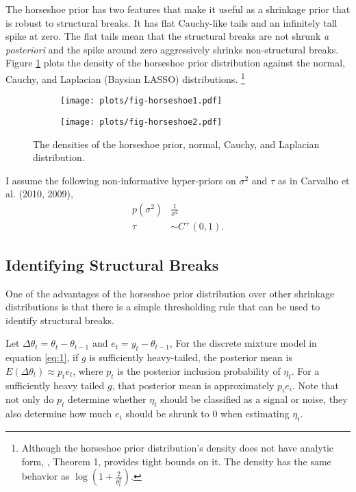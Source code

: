 \documentclass{article}
\begin{document}
The horseshoe prior has two features that make it useful as a shrinkage prior that is robust to structural breaks.
It has flat Cauchy-like tails and an infinitely tall spike at zero.
The flat tails mean that the structural breaks are not shrunk \textit{a posteriori} and the spike around zero aggressively shrinks non-structural breaks.
Figure \ref{fig:horseshoe} plots the density of the horseshoe prior distribution against the normal, Cauchy, and Laplacian (Baysian LASSO) distributions.%
\footnote{
  Although the horseshoe prior distribution's density does not have analytic form, \textcite{CarvalhoPolsonScott2010}, Theorem 1, provides tight bounds on it.
  The density has the same behavior as $\log (1 + \frac{2}{\theta_{t}^{2}})$.
}

\begin{figure}
  \centering
  \begin{subfigure}[b]{0.5\textwidth}
    \texttt{[image: plots/fig-horseshoe1.pdf]}
  \end{subfigure}%
  \begin{subfigure}[b]{0.5\textwidth}
    \texttt{[image: plots/fig-horseshoe2.pdf]}
  \end{subfigure}
  \caption{The densities of the horseshoe prior, normal, Cauchy, and Laplacian distribution.}
  \label{fig:horseshoe}
\end{figure}

I assume the following non-informative hyper-priors on $\sigma^{2}$ and $\tau$ as in Carvalho et al. (2010, 2009),
\begin{align}
  \label{eq:9}
  p(\sigma^{2}) & \frac{1}{\sigma^{2}}  \\
  \label{eq:11}
  \tau &\sim C^{+}(0, 1) \text{.}
\end{align}

\subsection{Identifying Structural Breaks}
\label{sec:ident-struct-breaks}

One of the advantages of the horseshoe prior distribution over other shrinkage distributions is that there is a simple thresholding rule that can be used to identify structural breaks.

Let $\Delta \theta_{t} = \theta_{t} - \theta_{t - 1}$ and $e_{t} = y_{t} - \theta_{t - 1}$, 
For the discrete mixture model in equation \eqref{eq:1}, if $g$ is sufficiently heavy-tailed, the posterior mean is $E(\Delta \theta_{t}) \approx p_{t} e_{t} $, where $p_{t}$ is the posterior inclusion probability of $\eta_{t}$.
For a sufficiently heavy tailed $g$, that posterior mean is approximately $p_{i} e_{i}$.
Note that not only do $p_{t}$ determine whether $\eta_{t}$ should be classified as a signal or noise, they also determine how much $e_{t}$ should be shrunk to 0 when estimating $\eta_{t}$.
\end{document}
